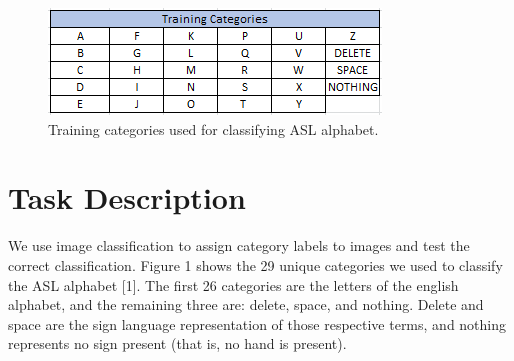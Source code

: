 \documentclass[conference]{IEEEtran}
\begin{document}
\begin{figure}[b]
\centering
\includegraphics[width=\linewidth]{Categories_table1}
\caption{Training categories used for classifying ASL alphabet.}
\end{figure}
\section{Task Description}
We use image classification to assign category labels to images and test the correct classification. Figure 1 shows the 29 unique categories we used to classify the ASL alphabet [1]. The first 26 categories are the letters of the english alphabet, and the remaining three are: delete, space, and nothing. Delete and space are the sign language representation of those respective terms, and nothing represents no sign present (that is, no hand is present). 
\end{document}
